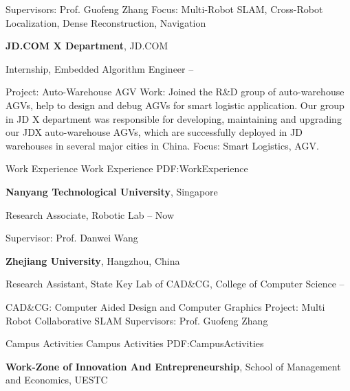 \documentclass[letterpaper,MMMyyyy,nonstopmode]{simpleresumecv}
\begin{document}
\begin{Body}
\begin{Detail}
\SubBulletItem
Supervisors:
Prof. Guofeng Zhang
\SubBulletItem
Focus:
Multi-Robot SLAM, Cross-Robot Localization, Dense Reconstruction, Navigation
\end{Detail}


\Entry
{\textbf{JD.COM X Department}}, JD.COM

\BulletItem
Internship, Embedded Algorithm Engineer
\hfill
{} --
\begin{Detail}
	\SubBulletItem
	Project:
	Auto-Warehouse AGV
	\SubBulletItem
	Work:
	Joined the R\&D group of auto-warehouse AGVs, help to design and debug AGVs for smart logistic application.
	Our group in JD X department was responsible for developing, maintaining and upgrading our JDX auto-warehouse AGVs, which are successfully deployed in JD warehouses in several major cities in China.
	\SubBulletItem
	Focus:
	Smart Logistics, AGV.
\end{Detail}


\Section
{Work\newline
	Experience}
{Work Experience}
{PDF:WorkExperience}

\Entry
{\textbf{Nanyang Technological University}},
Singapore

\BulletItem
Research Associate,
Robotic Lab
\hfill
{} --
Now
\begin{Detail}
	\SubBulletItem
	Supervisor:
	Prof. Danwei Wang
\end{Detail}

\Gap
\Entry
{\textbf{Zhejiang University}},
Hangzhou, China

\BulletItem
Research Assistant,
State Key Lab of CAD\&CG,
College of Computer Science
\hfill
{} --
\begin{Detail}
	\SubBulletItem
	CAD\&CG: Computer Aided Design and Computer Graphics
	\SubBulletItem
	Project: Multi Robot Collaborative SLAM
	\SubBulletItem
	\SubBulletItem
	Supervisors:
	Prof. Guofeng Zhang
\end{Detail}




\Section
{Campus Activities}
{Campus Activities}
{PDF:CampusActivities}

\Entry
{\textbf{Work-Zone of Innovation And Entrepreneurship}},
School of Management and Economics, 
UESTC


\end{Body}
\end{document}
